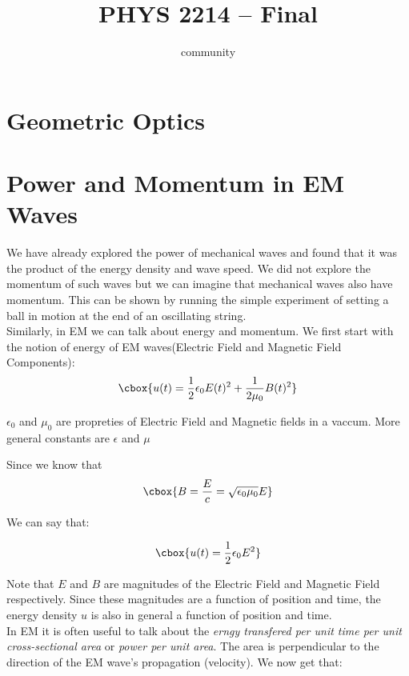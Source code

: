 \documentclass{hw}
\title{PHYS 2214 -- Final}
\author{community}
\numberwithin{equation}{section}
\begin{document}
\maketitle

\tableofcontents
\newpage{}

\section{Geometric Optics}

\section{Power and Momentum in EM Waves}
We have already explored the power of mechanical waves and found that it was
the product of the energy density and wave speed. We did not explore the
momentum of such waves but we can imagine that mechanical waves also have
momentum. This can be shown by running the simple experiment of setting a ball
in motion at the end of an oscillating string.\\

Similarly, in EM we can talk about energy and momentum. We first start with the
notion of energy of EM waves(Electric Field and Magnetic Field Components):
\begin{equation}
\cbox{%
  u(t)  = \frac{1}{2}\epsilon_0 E(t)^2+\frac{1}{2\mu_0}B(t)^2
}
\end{equation}

$\epsilon_0$ and $\mu_0$ are propreties of Electric Field and Magnetic fields
in a vaccum. More general constants are $\epsilon$ and $\mu$

Since we know that 
\begin{equation}
\cbox{%
  B = \frac{E}{c} = \sqrt{\epsilon_0 \mu_0} E
}
\end{equation}

We can say that:

\begin{equation}
\cbox{%
  u(t) = \frac{1}{2}\epsilon_0 E^2
}
\end{equation}

Note that $E$ and $B$ are magnitudes of the Electric Field and Magnetic Field
respectively. Since these magnitudes are a function of position and time, the
energy density $u$ is also in general a function of position and time.\\ 

In EM it is often useful to talk about the \textit{erngy transfered per unit
time per unit cross-sectional area} or \textit{power per unit area}. The area
is perpendicular to the direction of the EM wave's propagation (velocity). We
now get that:
\end{document}
